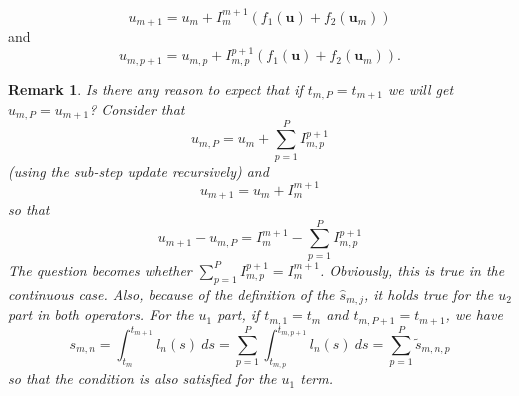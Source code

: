 \documentclass{article}
\newtheorem{remark}{Remark}
\newcommand{\ve}[1]{\mathbf{#1}}
\begin{document}
\begin{equation}
	u_{m+1} = u_{m} + I_m^{m+1} \left( f_1(\ve{u}) + f_2(\ve{u}_m) \right)
\end{equation}
and
\begin{equation}
	u_{m,p+1} = u_{m,p} + I_{m,p}^{p+1} \left( f_1(\ve{u}) + f_2(\ve{u}_m) \right).
\end{equation}
\begin{remark}
Is there any reason to expect that if $t_{m,P} = t_{m+1}$ we will get $u_{m,P} = u_{m+1}$? Consider that
\begin{equation}
	u_{m,P} = u_{m} + \sum_{p=1}^{P} I_{m,p}^{p+1}
\end{equation}
(using the sub-step update recursively) and
\begin{equation}
	u_{m+1} = u_m + I_{m}^{m+1}
\end{equation}
so that
\begin{equation}
	u_{m+1} - u_{m,P} = I_{m}^{m+1} - \sum_{p=1}^{P} I_{m,p}^{p+1}
\end{equation}
The question becomes whether $\sum_{p=1}^{P} I_{m,p}^{p+1} = I_{m}^{m+1}$.
Obviously, this is true in the continuous case.
Also, because of the definition of the $\hat{s}_{m,j}$, it holds true for the $u_2$ part in both operators.
For the $u_1$ part, if $t_{m,1} = t_m$ and $t_{m,P+1} = t_{m+1}$, we have
\begin{equation}
	s_{m,n} = \int_{t_m}^{t_{m+1}} l_n(s)~ds = \sum_{p=1}^{P} \int_{t_{m,p}}^{t_{m,p+1}} l_n(s)~ds = \sum_{p=1}^{P} \tilde{s}_{m,n,p}
\end{equation}
so that the condition is also satisfied for the $u_1$ term.
\end{remark}

\end{document}
